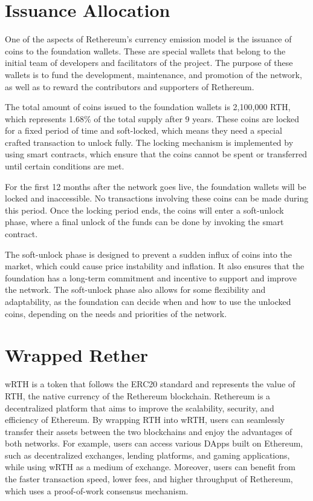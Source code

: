 \documentclass[a4paper,onecolumn, superscriptaddress,10pt,accepted=2020-05-01,issue=1, volume=2, shorttitle=papers]{compositionalityarticle}
\begin{document}
\section{Issuance Allocation}

One of the aspects of Rethereum’s currency emission model is the issuance of coins to the foundation wallets. These are special wallets that belong to the initial team of developers and facilitators of the project. The purpose of these wallets is to fund the development, maintenance, and promotion of the network, as well as to reward the contributors and supporters of Rethereum.

\vspace{0.3cm}

The total amount of coins issued to the foundation wallets is 2,100,000 RTH, which represents 1.68\% of the total supply after 9 years. These coins are locked for a fixed period of time and soft-locked, which means they need a special crafted transaction to unlock fully. The locking mechanism is implemented by using smart contracts, which ensure that the coins cannot be spent or transferred until certain conditions are met.

\vspace{0.3cm}

For the first 12 months after the network goes live, the foundation wallets will be locked and inaccessible. No transactions involving these coins can be made during this period. Once the locking period ends, the coins will enter a soft-unlock phase, where a final unlock of the funds can be done by invoking the smart contract.


\vspace{0.3cm}

The soft-unlock phase is designed to prevent a sudden influx of coins into the market, which could cause price instability and inflation. It also ensures that the foundation has a long-term commitment and incentive to support and improve the network. The soft-unlock phase also allows for some flexibility and adaptability, as the foundation can decide when and how to use the unlocked coins, depending on the needs and priorities of the network.

\vspace{0.3cm}

\section{Wrapped Rether}

wRTH is a token that follows the ERC20 standard and represents the value of RTH, the native currency of the Rethereum blockchain. Rethereum is a decentralized platform that aims to improve the scalability, security, and efficiency of Ethereum. By wrapping RTH into wRTH, users can seamlessly transfer their assets between the two blockchains and enjoy the advantages of both networks. For example, users can access various DApps built on Ethereum, such as decentralized exchanges, lending platforms, and gaming applications, while using wRTH as a medium of exchange. Moreover, users can benefit from the faster transaction speed, lower fees, and higher throughput of Rethereum, which uses a proof-of-work consensus mechanism.
\end{document}

